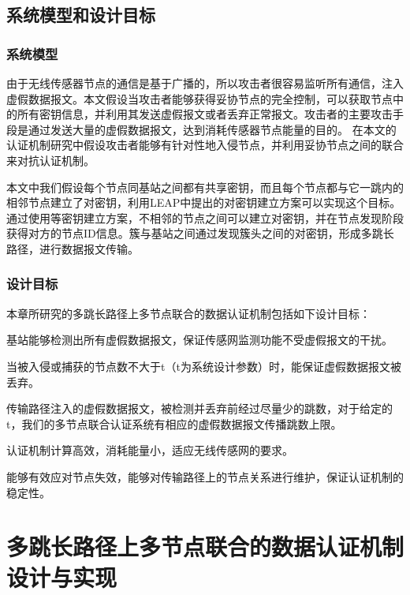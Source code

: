 \subsection{系统模型和设计目标}
\subsubsection{系统模型}
由于无线传感器节点的通信是基于广播的，所以攻击者很容易监听所有通信，注入虚假数据报文。本文假设当攻击者能够获得妥协节点的完全控制，可以获取节点中的所有密钥信息，并利用其发送虚假报文或者丢弃正常报文。攻击者的主要攻击手段是通过发送大量的虚假数据报文，达到消耗传感器节点能量的目的。
在本文的认证机制研究中假设攻击者能够有针对性地入侵节点，并利用妥协节点之间的联合来对抗认证机制。

本文中我们假设每个节点同基站之间都有共享密钥，而且每个节点都与它一跳内的相邻节点建立了对密钥，利用LEAP\cite{zhu2006leap}中提出的对密钥建立方案可以实现这个目标。通过使用\cite{liu2005establishing,du2005pairwise}等密钥建立方案，不相邻的节点之间可以建立对密钥，并在节点发现阶段获得对方的节点ID信息。簇与基站之间通过发现簇头之间的对密钥，形成多跳长路径，进行数据报文传输。


\subsubsection{设计目标}
本章所研究的多跳长路径上多节点联合的数据认证机制包括如下设计目标：
\begin{compactitem}
  \item 基站能够检测出所有虚假数据报文，保证传感网监测功能不受虚假报文的干扰。
  \item 当被入侵或捕获的节点数不大于t（t为系统设计参数）时，能保证虚假数据报文被丢弃。
  \item 传输路径注入的虚假数据报文，被检测并丢弃前经过尽量少的跳数，对于给定的t，我们的多节点联合认证系统有相应的虚假数据报文传播跳数上限。
  \item 认证机制计算高效，消耗能量小，适应无线传感网的要求。
  \item 能够有效应对节点失效，能够对传输路径上的节点关系进行维护，保证认证机制的稳定性。
\end{compactitem}

\section{多跳长路径上多节点联合的数据认证机制设计与实现}
